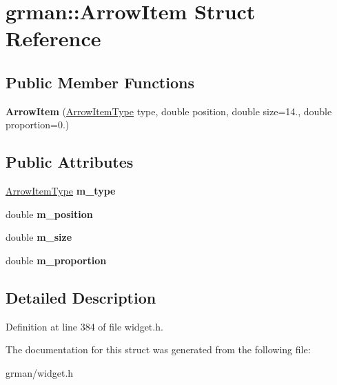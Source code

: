 \hypertarget{structgrman_1_1_arrow_item}{}\section{grman\+:\+:Arrow\+Item Struct Reference}
\label{structgrman_1_1_arrow_item}
\subsection*{Public Member Functions}
\begin{DoxyCompactItemize}
\item 
\mbox{\label{structgrman_1_1_arrow_item_ac8e314540ee54b43d5bb0d5a1f178d01}} 
{\bfseries Arrow\+Item} (\mbox{\hyperlink{namespacegrman_a6092293c9849bd8847921b542dee733c}{Arrow\+Item\+Type}} type, double position, double size=14., double proportion=0.)
\end{DoxyCompactItemize}
\subsection*{Public Attributes}
\begin{DoxyCompactItemize}
\item 
\mbox{\label{structgrman_1_1_arrow_item_af0cbe30f898453a2b6507f812753190e}} 
\mbox{\hyperlink{namespacegrman_a6092293c9849bd8847921b542dee733c}{Arrow\+Item\+Type}} {\bfseries m\+\_\+type}
\item 
\mbox{\label{structgrman_1_1_arrow_item_a2592668e21b5d0e62eee3977b3337fda}} 
double {\bfseries m\+\_\+position}
\item 
\mbox{\label{structgrman_1_1_arrow_item_a27e619cd38e8210bbe39016aa5d9dc18}} 
double {\bfseries m\+\_\+size}
\item 
\mbox{\label{structgrman_1_1_arrow_item_ac26bdc3069d42bff6f18d5dfa50fadde}} 
double {\bfseries m\+\_\+proportion}
\end{DoxyCompactItemize}


\subsection{Detailed Description}


Definition at line 384 of file widget.\+h.



The documentation for this struct was generated from the following file\+:\begin{DoxyCompactItemize}
\item 
grman/widget.\+h\end{DoxyCompactItemize}
